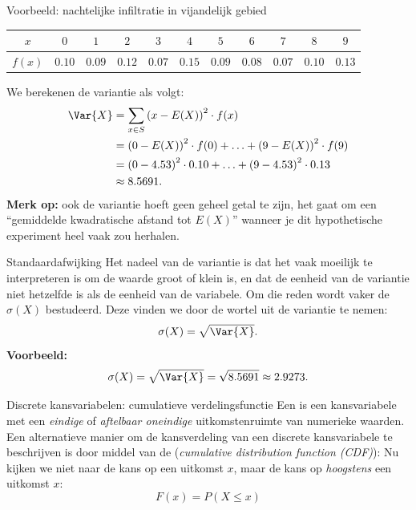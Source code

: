 \begin{frame}{Voorbeeld: nachtelijke infiltratie in vijandelijk gebied}
    
    {\small
        \begin{center}
            \begin{tabular}{*{11}{c}}
                \toprule
                    $x$     & $0$ & $1$ & $2$ & $3$ & $4$ & $5$ & $6$ & $7$ & $8$ & $9$ \\
                \midrule    
                    $f(x)$  & $0.10$ & $0.09$ & $0.12$ & $0.07$ & $0.15$ & $0.09$ & $0.08$ & $0.07$ & $0.10$ & $0.13$ \\
                \bottomrule
            \end{tabular}
        \end{center}
    }
    We berekenen de variantie als volgt:
    \begin{align*}
        \Var{X} &= \sum_{x \in S} \left(x - E(X)\right)^2 \cdot f(x) \\
                &= \left(0 - E(X)\right)^2 \cdot f(0) + \ldots + \left(9 - E(X)\right)^2 \cdot f(9) \\
                &= \left(0 - 4.53\right)^2 \cdot 0.10 + \ldots + \left(9 - 4.53\right)^2 \cdot 0.13 \\
                &\approx 8.5691.
    \end{align*}
    \vfill\pause
    \textbf{Merk op:} ook de variantie hoeft geen geheel getal te zijn, het gaat om een \enquote{gemiddelde kwadratische afstand tot $E(X)$} wanneer je dit hypothetische experiment heel vaak zou herhalen.
\end{frame}

\begin{frame}{Standaardafwijking}
    Het nadeel van de variantie is dat het vaak moeilijk te interpreteren is om de waarde groot of klein is, en dat de eenheid van de variantie niet hetzelfde is als de eenheid van de variabele.
    \vfill
    Om die reden wordt vaker de  $\sigma(X)$ bestudeerd.
    Deze vinden we door de wortel uit de variantie te nemen:
    \[
        \sigma(X) = \sqrt{\Var{X}}.
    \]\pause
    \vfill
    \textbf{Voorbeeld:}
    \[
        \sigma(X)  = \sqrt{\Var{X}} = \sqrt{8.5691} \approx 2.9273.
    \]
\end{frame}

\begin{frame}{Discrete kansvariabelen: cumulatieve verdelingsfunctie}
    Een  is een kansvariabele met een \emph{eindige} of \emph{aftelbaar oneindige} uitkomstenruimte van numerieke waarden.
    \vfill
    Een alternatieve manier om de kansverdeling van een discrete kansvariabele te beschrijven is door middel van
    de  (\emph{cumulative distribution function (CDF)}):
    \vfill
    Nu kijken we niet naar de kans op een uitkomst $x$, maar de kans op \emph{hoogstens} een uitkomst $x$:
    \[
        F(x) = P(X \leq x)
    \]
\end{frame}

